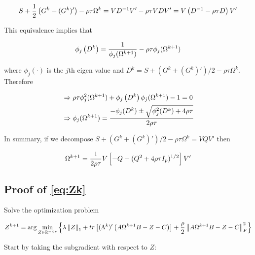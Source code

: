 \documentclass[11pt,]{report}
\theoremstyle{definition}
\theoremstyle{definition}
\theoremstyle{definition}
\theoremstyle{remark}
\begin{document}
\begin{equation}
S + \frac{1}{2}\left(G^{k} + (G^{k})'\right) - \rho\tau\Omega^{k} = VD^{-1}V' - \rho\tau VDV' = V\left(D^{-1} - \rho\tau D\right)V' \notag
\end{equation}

This equivalence implies that

\begin{equation}
\phi_{j}\left( D^{k} \right) = \frac{1}{\phi_{j}(\Omega^{k + 1})} - \rho\tau\phi_{j}(\Omega^{k + 1}) \notag
\end{equation}

where \(\phi_{j}(\cdot)\) is the \(j\)th eigen value and \(D^{k} = S + \left(G^{k} + (G^{k})'\right)/2 - \rho\tau\Omega^{k}\). Therefore

\begin{equation}
\begin{split}
  &\Rightarrow \rho\tau\phi_{j}^{2}(\Omega^{k + 1}) + \phi_{j}\left( D^{k} \right)\phi_{j}(\Omega^{k + 1}) - 1 = 0 \\
  &\Rightarrow \phi_{j}(\Omega^{k + 1}) = \frac{-\phi_{j}(D^{k}) \pm \sqrt{\phi_{j}^{2}(D^{k}) + 4\rho\tau}}{2\rho\tau}
\end{split}
\notag
\end{equation}

In summary, if we decompose \(S + \left(G^{k} + (G^{k})'\right)/2 - \rho\tau\Omega^{k} = VQV'\) then

\begin{equation}
\Omega^{k + 1} = \frac{1}{2\rho\tau}V\left[ -Q + (Q^{2} + 4\rho\tau I_{p})^{1/2}\right] V'
\label{eq:appendixomegaproof2}\notag
\end{equation}

\hypertarget{proofZk}{%
\subsection{Proof of \eqref{eq:Zk}}\label{proofZk}}

Solve the optimization problem

\begin{equation}
Z^{k + 1} = \arg\min_{Z \in \mathbb{R}^{n \times r}}\left\{ \lambda\left\| Z \right\|_{1} + tr\left[(\Lambda^{k})'\left(A\Omega^{k + 1}B - Z - C\right)\right] + \frac{\rho}{2}\left\| A\Omega^{k + 1}B - Z - C \right\|_{F}^{2} \right\}
\label{eq:appendixZZloglik2}\notag
\end{equation}

Start by taking the subgradient with respect to \(Z\):
\end{document}
